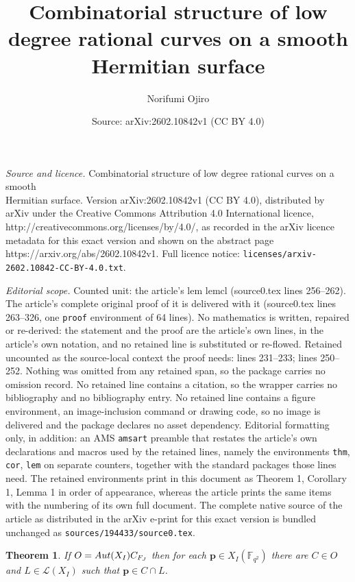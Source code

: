 \documentclass[10pt,a4paper]{amsart}
\title{Combinatorial structure of low degree rational curves on a smooth\\Hermitian surface}
\author{Norifumi Ojiro}
\date{Source: arXiv:2602.10842v1 (CC BY 4.0)}
\newtheorem{thm}{Theorem}
\begin{document}
\maketitle

\noindent\emph{Source and licence.} Combinatorial structure of low degree rational curves on a smooth\\Hermitian surface. Version arXiv:2602.10842v1 (CC BY 4.0), distributed by arXiv under the Creative Commons Attribution 4.0 International licence, http://creativecommons.org/licenses/by/4.0/, as recorded in the arXiv licence metadata for this exact version and shown on the abstract page https://arxiv.org/abs/2602.10842v1. Full licence notice: \texttt{licenses/arxiv-2602.10842-CC-BY-4.0.txt}.\par\smallskip

\noindent\textit{Editorial scope.} Counted unit: the article's lem lemcl (source0.tex lines 256--262). The article's complete original proof of it is delivered with it (source0.tex lines 263--326, one \texttt{proof} environment of 64 lines). No mathematics is written, repaired or re-derived: the statement and the proof are the article's own lines, in the article's own notation, and no retained line is substituted or re-flowed.  Retained uncounted as the source-local context the proof needs: lines 231--233; lines 250--252.  Nothing was omitted from any retained span, so the package carries no omission record.  No retained line contains a citation, so the wrapper carries no bibliography and no bibliography entry.  No retained line contains a figure environment, an image-inclusion command or drawing code, so no image is delivered and the package declares no asset dependency.  Editorial formatting only, in addition: an AMS \texttt{amsart} preamble that restates the article's own declarations and macros used by the retained lines, namely the environments \texttt{thm}, \texttt{cor}, \texttt{lem} on separate counters, together with the standard packages those lines need.  The retained environments print in this document as Theorem 1, Corollary 1, Lemma 1 in order of appearance, whereas the article prints the same items with the numbering of its own full document.  The complete native source of the article as distributed in the arXiv e-print for this exact version is bundled unchanged as \texttt{sources/194433/source0.tex}.
\begin{thm}\label{thmcl1}
If $O={\rm Aut}(X_I)C_{F_J}$ then for each $\bm{p}\in X_I(\mathbb{F}_{q^2})$ there are $C\in O$ and $L\in\mathcal{L}(X_I)$ such that $\bm{p}\in C\cap L$.
\end{thm}
\end{document}
